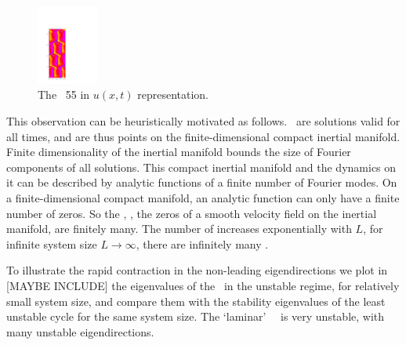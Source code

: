 \begin{figure}[t]
\begin{center}
    \includegraphics[width=0.18\textwidth]{../figs/rpo22-55-4-u}
\end{center}
\caption[The \rpo\ T=55 in  u(x,t)  representation]
        {
 The \rpo\ {\nameit}55 in $u(x,t)$ representation.
        }
\label{f:rpo55u}
\end{figure}




This observation can be heuristically motivated as follows.
\Eqva\ are solutions valid for all times, and are thus points
on the finite-dimensional compact inertial manifold.
Finite dimensionality of the inertial manifold
bounds the size of Fourier components of all solutions.
This
compact inertial manifold and the dynamics on it can be
described by analytic functions of a finite number of Fourier modes.
On a finite-dimensional compact manifold,
an analytic function can only have a finite number
of zeros. So the {\eqva}, {\ie},
the zeros of a smooth velocity field on
the inertial manifold, are finitely many.
The number of {\eqva} increases exponentially with $L$,
for infinite system size $L \to \infty$,
there are infinitely many {\eqva}.

\bigskip

To illustrate the rapid contraction in the non-leading eigendirections
we plot  in [MAYBE INCLUDE] %
the eigenvalues of the \eqv\ in the unstable regime,
for relatively small system size, %
and compare them with the
stability eigenvalues of the least unstable cycle for the same
system size.
The `laminar' ~\eqv\ is very unstable,
with many unstable eigendirections.


